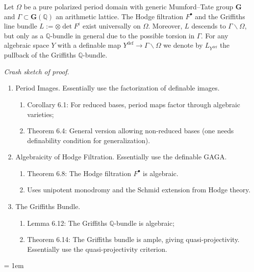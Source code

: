 \documentclass{amsart}
\theoremstyle{definition}
\numberwithin{equation}{section}
\newcommand{\definable}{\mathrm{def}}
\begin{document}
Let $\Omega$ be a pure polarized period domain with generic Mumford–Tate group $\mathbf{G}$
and $\Gamma \subset \mathbf{G}(\mathbb{Q})$ an arithmetic lattice.
The Hodge filtration $F^{\bullet}$ and the Griffiths line bundle $L := \otimes \det F^i$
exist universally on $\Omega$.
Moreover, $L$ descends to $\Gamma \backslash \Omega$, but only as a $\mathbb{Q}$-bundle in general
due to the possible torsion in $\Gamma$.
For any algebraic space $Y$ with a definable map $Y^\definable \to \Gamma \backslash \Omega$
we denote by $L_{Y^\definable}$ the pullback of the Griffiths $\mathbb{Q}$-bundle.

\textit{Crash sketch of proof.}
\begin{enumerate}
	\item Period Images. Essentially use the factorization of definable images.
	\begin{enumerate}
		\item Corollary 6.1: For reduced bases, period maps factor through algebraic varieties;
		\item Theorem 6.4: General version allowing non-reduced bases (one needs definability condition for generalization).
	\end{enumerate}
	\item Algebraicity of Hodge Filtration. Essentially use the definable GAGA.
	\begin{enumerate}
		\item Theorem 6.8: The Hodge filtration $F^{\bullet}$ is algebraic.
		\item Uses unipotent monodromy and the Schmid extension from Hodge theory.
	\end{enumerate}
	\item The Griffiths Bundle.
	\begin{enumerate}
		\item Lemma 6.12: The Griffiths $\mathbb{Q}$-bundle is algebraic;
		\item Theorem 6.14: The Griffiths bundle is ample, giving quasi-projectivity. Essentially use the quasi-projectivity criterion.
	\end{enumerate}
\end{enumerate}



\emergencystretch = 1em
\printbibliography
\end{document}
